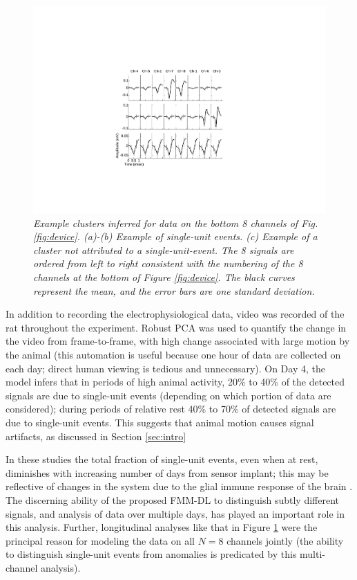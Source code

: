 \documentclass[journal]{IEEEtran}
\begin{document}
\begin{figure}[h!]
  \centering
    \includegraphics[width=1.0\linewidth]{figs_new/singleunits.pdf}
\caption{\label{fig:units}\small{\emph{Example
clusters inferred for data on the bottom 8 channels of Fig.
\ref{fig:device}. (a)-(b) Example of single-unit events. (c) Example
of a cluster \emph{not} attributed to a single-unit-event. The 8
signals are ordered from left to right consistent with the numbering
of the 8 channels at the bottom of Figure \ref{fig:device}. The black curves represent the mean, and the error bars are one standard deviation.}}}
\label{fig:units}
\end{figure}
In addition to recording the electrophysiological data, video was recorded of the rat throughout{ the experiment}. Robust PCA \cite{Wright09} was used to quantify the change in the video from frame-to-frame, with high change associated with large motion by the animal (this automation is {useful} because one hour of data are collected on each day; direct human viewing is tedious and unnecessary). On Day 4, the model infers that in periods of high animal activity, 20\% to 40\% of the detected signals are due to single-unit events (depending on which portion of data are considered); during periods of relative rest 40\% to 70\% of detected signals are due to single-unit events. This suggests that animal motion causes signal artifacts, as discussed in Section \ref{sec:intro}


In these studies the total fraction of single-unit events, even when at rest, diminishes with increasing number of days from sensor implant; this may be reflective of changes in the system due to the glial immune response of the brain \cite{Biran,Szarowski03}. The discerning ability of the proposed FMM{-DL} to distinguish subtly different signals, and analysis of data over multiple days, has played an important role in this analysis. Further, {longitudinal} analyses like that in Figure \ref{fig:units} were the principal reason for modeling the data on all $N=8$ channels jointly (the ability to distinguish single-unit events from anomalies is predicated by this multi-channel analysis).
\end{document}
